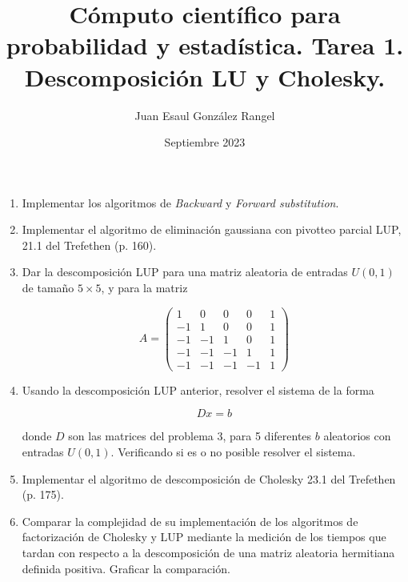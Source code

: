 \documentclass{article}
\title{Cómputo científico para probabilidad y estadística. Tarea 1.\\
Descomposición LU y Cholesky.}
\author{Juan Esaul González Rangel}
\date{Septiembre 2023}
\begin{document}
\maketitle


\begin{enumerate}

    \item Implementar los algoritmos de \textit{Backward} y \textit{Forward substitution}.

    \item Implementar el algoritmo de eliminación gaussiana con pivotteo parcial LUP, 21.1 del Trefethen (p. 160).

    \item Dar la descomposición LUP para una matriz aleatoria de entradas $U (0, 1)$ de tamaño $5 \times 5$, y para la matriz

    \begin{equation}
        A = \begin{pmatrix}
            1 & 0 & 0 & 0 & 1 \\
            -1 & 1 & 0 & 0 & 1 \\
            -1 & -1 & 1 & 0 & 1 \\
            -1 & -1 & -1 & 1 & 1 \\
            -1 & -1 & -1 & -1 & 1
        \end{pmatrix}
    \end{equation}

    \item Usando la descomposición LUP anterior, resolver el sistema de la forma

\begin{equation}
    Dx = b
\end{equation}

donde $D$ son las matrices del problema 3, para 5 diferentes $b$ aleatorios con entradas $U (0, 1)$. Verificando si es o no posible resolver el sistema.

    \item  Implementar el algoritmo de descomposición de Cholesky 23.1 del Trefethen (p. 175).

    \item Comparar la complejidad de su implementación de los algoritmos de
factorización de Cholesky y LUP mediante la medición de los tiempos
que tardan con respecto a la descomposición de una matriz aleatoria
hermitiana definida positiva. Graficar la comparación.
   
\end{enumerate}




 
\end{document}
